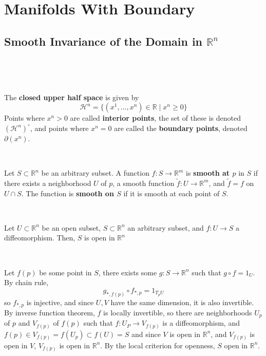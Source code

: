 \documentclass{article}
\begin{document}
\section{Manifolds With Boundary}

\subsection{Smooth Invariance of the Domain in $\mathbb{R}^n$}
\

\begin{definition}
  \

  The \textbf{closed upper half space} is given by $$\mathcal{H}^n = \{(x^1, \dots, x^n) \in \mathbb{R} \mid x^n \geq 0\}$$Points where $x^n > 0$ are called \textbf{interior points}, the set of these is denoted $(\mathcal{H}^n)^\circ$, and points where $x^n = 0$ are called the \textbf{boundary points}, denoted $\partial(x^n)$.
\end{definition}

\begin{definition}
  \

  Let $S \subset \mathbb{R}^n$ be an arbitrary subset. A function $f: S \to \mathbb{R}^m$ is \textbf{smooth at $p$} in $S$ if there exists a neighborhood $U$ of $p$, a smooth function $\tilde{f}: U \to \mathbb{R}^m$, and $\tilde{f} = f$ on $U \cap S$. The function is \textbf{smooth on $S$} if it is smooth at each point of $S$.
\end{definition}

\begin{theorem}
  \

  Let $U \subset \mathbb{R}^n$ be an open subset, $S \subset \mathbb{R}^n$ an arbitrary subset, and $f: U \to S$ a diffeomorphism. Then, $S$ is open in $\mathbb{R}^n$
\end{theorem}

\begin{customproof}
  \

  Let $f(p)$ be some point in $S$, there exists some $g: S \to \mathbb{R}^n$ such that $g\circ f = 1_U$. By chain rule, $$g_{*, f(p)} \circ f_{*,p} = 1_{T_pU}$$so $f_{*,p}$ is injective, and since $U, V$ have the same dimension, it is also invertible. By inverse function theorem, $f$ is locally invertible, so there are neighborhoods $U_p$ of $p$ and $V_{f(p)}$ of $f(p)$ such that $f: U_P \to V_{f(p)}$ is a diffeomorphism, and $f(p) \in V_{f(p)} = f(U_p) \subset f(U) = S$ and since $V$ is open in $\mathbb{R}^n$, and $V_{f(p)}$ is open in $V$, $V_{f(p)}$ is open in $\mathbb{R}^n$. By the local criterion for openness, $S$ open in $\mathbb{R}^n$.
\end{customproof}
\end{document}
